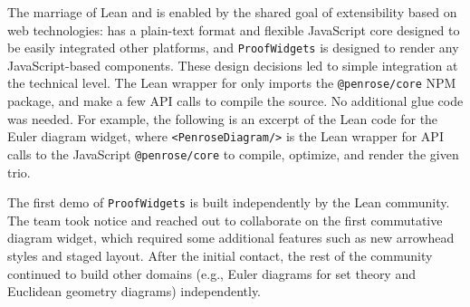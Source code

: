 

The marriage of Lean and \Penrose{} is enabled by the shared goal of extensibility based on web technologies: \Penrose{} has a plain-text format and flexible JavaScript core designed to be easily integrated other platforms, and \texttt{ProofWidgets} is designed to render any JavaScript-based components. These design decisions led to simple integration at the technical level. The Lean wrapper for \Penrose{} only imports the \texttt{@penrose/core} NPM package, and make a few API calls to compile the \Penrose{} source. No additional glue code was needed. For example, the following is an excerpt of the Lean code for the Euler diagram widget, where \texttt{<PenroseDiagram/>} is the Lean wrapper for API calls to the JavaScript \texttt{@penrose/core} to compile, optimize, and render the given \Penrose{} trio. 

The first demo of \texttt{ProofWidgets} is built independently by the Lean community. The \Penrose{} team took notice and reached out to collaborate on the first commutative diagram widget, which required some additional features such as new arrowhead styles and staged layout. After the initial contact, the rest of the community continued to build other domains (e.g., Euler diagrams for set theory and Euclidean geometry diagrams) independently. 

